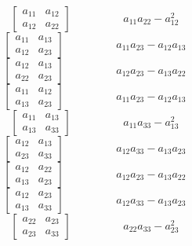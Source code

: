 \documentclass[12pt]{article}
\begin{document}
$$\left[\begin{matrix}a_{11} & a_{12}\\a_{12} & a_{22}\end{matrix}\right]\hspace{2cm} a_{11} a_{22} - a_{12}^{2}$$   
$$\left[\begin{matrix}a_{11} & a_{13}\\a_{12} & a_{23}\end{matrix}\right]\hspace{2cm} a_{11} a_{23} - a_{12} a_{13}$$   
$$\left[\begin{matrix}a_{12} & a_{13}\\a_{22} & a_{23}\end{matrix}\right]\hspace{2cm} a_{12} a_{23} - a_{13} a_{22}$$   
$$\left[\begin{matrix}a_{11} & a_{12}\\a_{13} & a_{23}\end{matrix}\right]\hspace{2cm} a_{11} a_{23} - a_{12} a_{13}$$   
$$\left[\begin{matrix}a_{11} & a_{13}\\a_{13} & a_{33}\end{matrix}\right]\hspace{2cm} a_{11} a_{33} - a_{13}^{2}$$   
$$\left[\begin{matrix}a_{12} & a_{13}\\a_{23} & a_{33}\end{matrix}\right]\hspace{2cm} a_{12} a_{33} - a_{13} a_{23}$$   
$$\left[\begin{matrix}a_{12} & a_{22}\\a_{13} & a_{23}\end{matrix}\right]\hspace{2cm} a_{12} a_{23} - a_{13} a_{22}$$   
$$\left[\begin{matrix}a_{12} & a_{23}\\a_{13} & a_{33}\end{matrix}\right]\hspace{2cm} a_{12} a_{33} - a_{13} a_{23}$$   
$$\left[\begin{matrix}a_{22} & a_{23}\\a_{23} & a_{33}\end{matrix}\right]\hspace{2cm} a_{22} a_{33} - a_{23}^{2}$$
\end{document}
